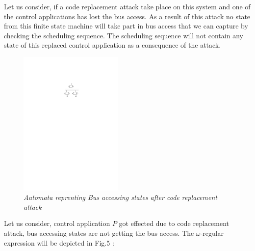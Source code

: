 Let us consider, if a code replacement attack take place on this system and one of the 
control applications has lost the bus access. As a result of this attack no state from
this finite state machine will take part in bus access that we can capture by checking
the scheduling sequence. The scheduling sequence will not contain any state of this replaced
control application as a consequence of the attack. 

\begin{figure}
\begin{center}
\includegraphics[width=2.0in]{state_diagram_task_replaced.pdf}
\end{center}
\vspace{-0.1in}
\caption{{\em Automata reprenting Bus accessing states after code replacement attack}}
\label{fig:automaton}
\end{figure}

Let us consider, control application $P$ got effected due to code replacement attack,
bus accessing states are not getting the bus access. The $\omega$-regular expression 
will be depicted in Fig.5 :

